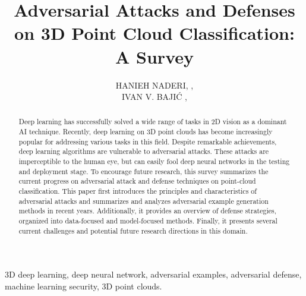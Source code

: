 \documentclass{ieeeaccess}
\begin{document}


\title{Adversarial Attacks and Defenses on 3D Point Cloud Classification: A Survey}
\author{\uppercase{Hanieh Naderi}, ,
\\
\uppercase{Ivan V. Baji\'{c}
,
}}
\address[1]{Department of Computer Engineering, Sharif University of Technology Tehran (e-mail: hanieh.naderii@gmail.com)}
\address[2]{School of Engineering
Science, Simon Fraser University, Burnaby, BC, Canada (e-mail: ibajic@ensc.sfu.ca)}



\begin{abstract}

Deep learning has successfully solved a wide range of tasks in 2D vision as a dominant AI technique. Recently, deep learning on 3D point clouds has become increasingly popular for addressing various tasks in this field. Despite remarkable achievements, deep learning algorithms are vulnerable to adversarial attacks. These attacks are imperceptible to the human eye, but can easily fool deep neural networks in the testing and deployment stage.
To encourage future research, this survey summarizes the current progress on adversarial attack and defense techniques on point-cloud classification. This paper first introduces the principles and characteristics of adversarial attacks and summarizes and analyzes adversarial example generation methods in recent years. Additionally, it provides an overview of defense strategies, organized into data-focused and model-focused methods.  Finally, it presents several current challenges and potential future research directions in this domain.

\end{abstract}

\begin{keywords}
3D deep learning, deep neural network, adversarial examples, adversarial defense, machine learning security, 3D point clouds.
\end{keywords}

\titlepgskip=-15pt

\maketitle
\begingroup\renewcommand\thefootnote{\textsection}
\end{document}
